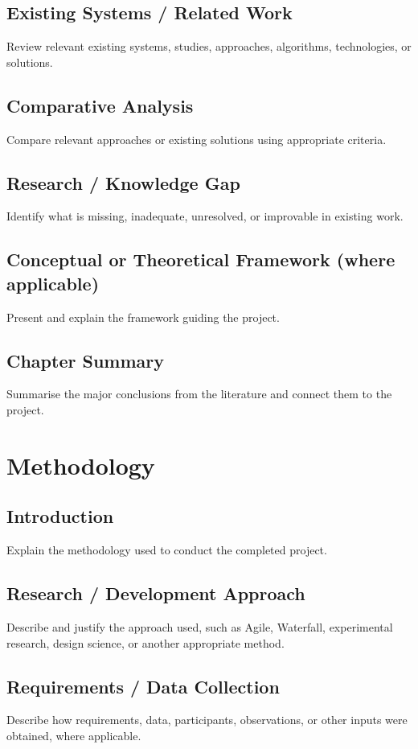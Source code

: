 \documentclass[12pt,a4paper]{report}
\begin{document}
\section{Existing Systems / Related Work}
Review relevant existing systems, studies, approaches, algorithms, technologies, or solutions.

\section{Comparative Analysis}
Compare relevant approaches or existing solutions using appropriate criteria.

\section{Research / Knowledge Gap}
Identify what is missing, inadequate, unresolved, or improvable in existing work.

\section{Conceptual or Theoretical Framework (where applicable)}
Present and explain the framework guiding the project.

\section{Chapter Summary}
Summarise the major conclusions from the literature and connect them to the project.

\chapter{Methodology}

\section{Introduction}
Explain the methodology used to conduct the completed project.

\section{Research / Development Approach}
Describe and justify the approach used, such as Agile, Waterfall, experimental research, design science, or another appropriate method.

\section{Requirements / Data Collection}
Describe how requirements, data, participants, observations, or other inputs were obtained, where applicable.
\end{document}
